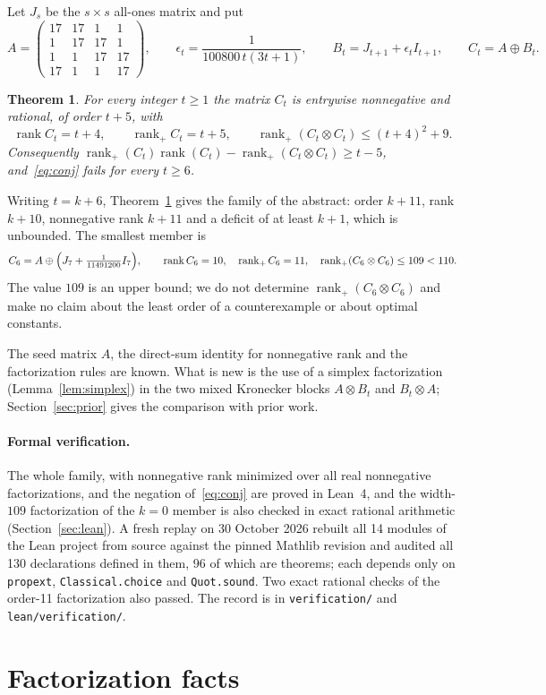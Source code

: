 \documentclass[11pt]{article}
\newtheorem{theorem}{Theorem}
\theoremstyle{remark}
\newcommand{\code}[1]{\nolinkurl{#1}}
\newcommand{\rk}{\operatorname{rank}}
\newcommand{\rp}{\operatorname{rank}_+}
\newcommand{\replaystatus}{A fresh replay on 30 October 2026 rebuilt all 14 modules of the Lean project from source against the pinned Mathlib revision and audited all 130 declarations defined in them, 96 of which are theorems; each depends only on \code{propext}, \code{Classical.choice} and \code{Quot.sound}. Two exact rational checks of the order-11 factorization also passed. The record is in \code{verification/} and \code{lean/verification/}.}
\begin{document}
Let $J_s$ be the $s\times s$ all-ones matrix and put
\begin{equation}\label{eq:witness}
A=\begin{pmatrix}17&17&1&1\\1&17&17&1\\1&1&17&17\\17&1&1&17\end{pmatrix},\qquad
\epsilon_t=\frac{1}{100800\,t(3t+1)},\qquad B_t=J_{t+1}+\epsilon_tI_{t+1},\qquad C_t=A\oplus B_t.
\end{equation}

\begin{theorem}\label{thm:main}
For every integer $t\ge1$ the matrix $C_t$ is entrywise nonnegative and rational, of order $t+5$, with
\[
\rk C_t=t+4,\qquad \rp C_t=t+5,\qquad \rp(C_t\otimes C_t)\le(t+4)^2+9 .
\]
Consequently $\rp(C_t)\rk(C_t)-\rp(C_t\otimes C_t)\ge t-5$, and~\eqref{eq:conj} fails for every $t\ge6$.
\end{theorem}

Writing $t=k+6$, Theorem~\ref{thm:main} gives the family of the abstract: order $k+11$, rank $k+10$, nonnegative rank $k+11$ and a deficit of at least $k+1$, which is unbounded. The smallest member is
\[
C_6=A\oplus\Bigl(J_7+\tfrac{1}{11491200}I_7\Bigr),\qquad \rk C_6=10,\quad \rp C_6=11,\quad \rp(C_6\otimes C_6)\le109<110 .
\]
The value $109$ is an upper bound; we do not determine $\rp(C_6\otimes C_6)$ and make no claim about the least order of a counterexample or about optimal constants.

The seed matrix $A$, the direct-sum identity for nonnegative rank and the factorization rules are known. What is new is the use of a simplex factorization (Lemma~\ref{lem:simplex}) in the two mixed Kronecker blocks $A\otimes B_t$ and $B_t\otimes A$; Section~\ref{sec:prior} gives the comparison with prior work.

\paragraph{Formal verification.} The whole family, with nonnegative rank minimized over all real nonnegative factorizations, and the negation of~\eqref{eq:conj} are proved in Lean~4, and the width-$109$ factorization of the $k=0$ member is also checked in exact rational arithmetic (Section~\ref{sec:lean}). \replaystatus

\section{Factorization facts}\label{sec:facts}
\end{document}
